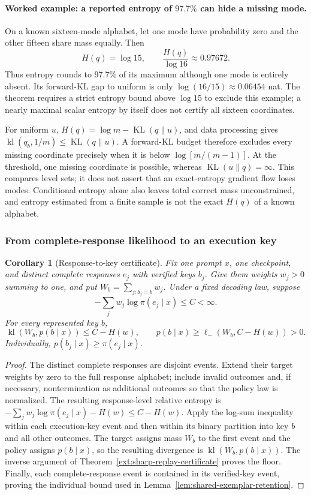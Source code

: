 \documentclass{article}
\newcommand{\1}{\mathbf 1}
\newtheorem{corollary}[lemma]{Corollary}
\theoremstyle{remark}
\theoremstyle{definition}
\theoremstyle{plain}
\begin{document}
\paragraph{Worked example: a reported entropy of $97.7\%$ can hide a missing mode.}
On a known sixteen-mode alphabet, let one mode have probability zero and the
other fifteen share mass equally. Then
\[
 H(q)=\log15,\qquad \frac{H(q)}{\log16}\approx0.97672.
\]
Thus entropy rounds to $97.7\%$ of its maximum although one mode is entirely
absent. Its forward-KL gap to uniform is only
$\log(16/15)\approx0.06454$ nat. The theorem requires a strict entropy bound
above $\log15$ to exclude this example; a nearly maximal scalar entropy by
itself does not certify all sixteen coordinates.

For uniform $u$, $H(q)=\log m-\operatorname{KL}(q\|u)$, and data processing
gives $\operatorname{kl}(q_b,1/m)\le\operatorname{KL}(q\|u)$. A forward-KL
budget therefore excludes every missing coordinate precisely when it is
below $\log[m/(m-1)]$. At the threshold, one missing coordinate is possible,
whereas $\operatorname{KL}(u\|q)=\infty$. This compares level sets; it does
not assert that an exact-entropy gradient flow loses modes. Conditional
entropy alone also leaves total correct mass unconstrained, and entropy
estimated from a finite sample is not the exact $H(q)$ of a known alphabet.

\subsubsection{From complete-response likelihood to an execution key}

\begin{corollary}[Response-to-key certificate]
\label{ext:response-key-certificate}
Fix one prompt $x$, one checkpoint, and distinct complete responses $e_j$
with verified keys $b_j$. Give them weights $w_j>0$ summing to one, and put
$W_b=\sum_{j:b_j=b}w_j$. Under a fixed decoding law, suppose
\[
 -\sum_j w_j\log\pi(e_j\mid x)\le C<\infty.
\]
For every represented key $b$,
\[
 \operatorname{kl}(W_b,p(b\mid x))\le C-H(w),\qquad
 p(b\mid x)\ge\ell_-(W_b,C-H(w))>0.
\]
Individually, $p(b_j\mid x)\ge\pi(e_j\mid x)$.
\end{corollary}
\begin{proof}
The distinct complete responses are disjoint events. Extend their target
weights by zero to the full response alphabet; include invalid outcomes
and, if necessary, nontermination as additional outcomes so that the policy
law is normalized. The resulting response-level relative entropy is
$-\sum_jw_j\log\pi(e_j\mid x)-H(w)\le C-H(w)$. Apply the log-sum inequality
within each execution-key event and then within its binary partition into
key $b$ and all other outcomes. The target assigns mass $W_b$ to the first
event and the policy assigns $p(b\mid x)$, so the resulting divergence is
$\operatorname{kl}(W_b,p(b\mid x))$. The inverse argument of
Theorem~\ref{ext:sharp-replay-certificate} proves the floor. Finally, each
complete-response event is contained in its verified-key event, proving
the individual bound used in Lemma~\ref{lem:shared-exemplar-retention}.
\end{proof}
\end{document}
